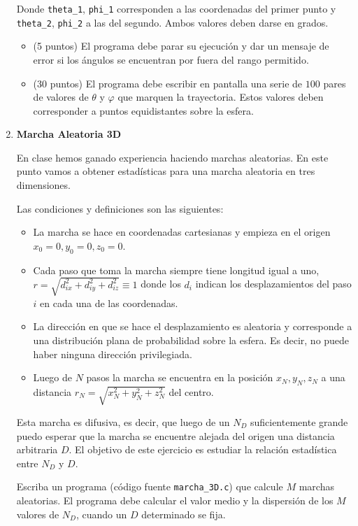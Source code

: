 \documentclass{article}
\begin{document}
\begin{enumerate}
Donde \verb"theta_1", \verb"phi_1" corresponden a las coordenadas del primer punto y \verb"theta_2", \verb"phi_2" a las del segundo. Ambos valores deben darse en grados.

\begin{itemize}
\item (5 puntos) El programa debe parar su ejecuci\'on y dar un mensaje de error si los \'angulos se encuentran por fuera del rango permitido.
\item (30 puntos) El programa debe escribir en pantalla una serie de $100$ pares de valores de $\theta$ y $\varphi$ que marquen la trayectoria. Estos valores deben corresponder a puntos equidistantes sobre la esfera.
\end{itemize}

\item {\bf Marcha Aleatoria 3D}

En clase hemos ganado experiencia haciendo marchas aleatorias. En este punto vamos a obtener estad\'isticas para una marcha aleatoria en tres dimensiones. 


Las condiciones y definiciones son las siguientes:
\begin{itemize}
\item La marcha se hace en coordenadas cartesianas y empieza en el origen $x_{0}=0, y_0=0, z_0=0$. 
\item Cada paso que toma la marcha siempre tiene longitud igual a uno, $r=\sqrt{d_{ix}^2 + d_{iy}^2 + d_{iz}^2}\equiv 1$ donde los $d_{i}$ indican los desplazamientos del paso $i$ en cada una de las coordenadas. 
\item La direcci\'on en que se hace el desplazamiento es aleatoria y corresponde a una distribuci\'on plana de probabilidad sobre la esfera. Es decir, no puede haber ninguna direcci\'on privilegiada.  
\item Luego de $N$ pasos la marcha se encuentra en la posici\'on $x_N, y_N, z_N$ a una distancia $r_N=\sqrt{x_{N}^2 + y_{N}^2 + z_{N}^2}$ del centro.
\end{itemize}

Esta marcha es difusiva, es decir, que luego de un $N_D$ suficientemente grande puedo esperar que la marcha se encuentre alejada del origen una distancia arbitraria $D$. El objetivo de este ejercicio es estudiar la relaci\'on estad\'istica entre $N_D$ y $D$.

Escriba un programa (c\'odigo fuente \verb"marcha_3D.c") que calcule
$M$ marchas aleatorias. El programa debe calcular el valor medio y la
dispersi\'on de los $M$ valores de $N_D$, cuando un $D$ determinado se fija.


\end{enumerate}
\end{document}

